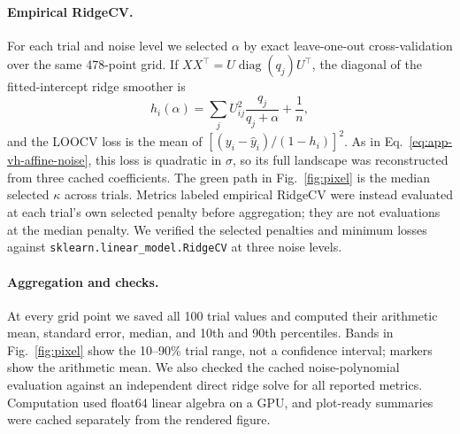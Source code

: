 \paragraph{Empirical RidgeCV.}
For each trial and noise level we selected $\alpha$ by exact leave-one-out
cross-validation over the same 478-point grid.  If $XX^\top=U\operatorname{diag}(q_j)U^\top$,
the diagonal of the fitted-intercept ridge smoother is
\begin{equation}
 h_i(\alpha)=\sum_jU_{ij}^2\frac{q_j}{q_j+\alpha}+\frac1n,
\end{equation}
and the LOOCV loss is the mean of
$[(y_i-\widehat y_i)/(1-h_i)]^2$.  As in
Eq.~\ref{eq:app-vh-affine-noise}, this loss is quadratic in $\sigma$, so its
full landscape was reconstructed from three cached coefficients.  The green
path in Fig.~\ref{fig:pixel} is the median selected $\kappa$ across trials.
Metrics labeled empirical RidgeCV were instead evaluated at each trial's own
selected penalty before aggregation; they are not evaluations at the median
penalty.  We verified the selected penalties and minimum losses against
\texttt{sklearn.linear\_model.RidgeCV} at three noise levels.

\paragraph{Aggregation and checks.}
At every grid point we saved all 100 trial values and computed their
arithmetic mean, standard error, median, and 10th and 90th percentiles.  Bands
in Fig.~\ref{fig:pixel} show the 10--90\% trial range, not a confidence
interval; markers show the arithmetic mean.  We also checked the cached
noise-polynomial evaluation against an independent direct ridge solve for
all reported metrics.  Computation used float64 linear algebra on a GPU, and
plot-ready summaries were cached separately from the rendered figure.
